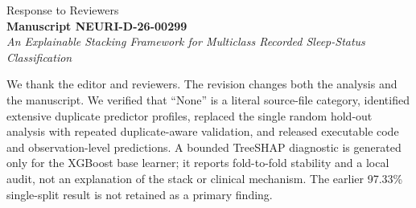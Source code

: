\documentclass[11pt]{article}
\begin{document}
\begin{center}
{\Large Response to Reviewers}\\[0.5em]
\textbf{Manuscript NEURI-D-26-00299}\\
\emph{An Explainable Stacking Framework for Multiclass Recorded Sleep-Status Classification}
\end{center}

We thank the editor and reviewers. The revision changes both the analysis and the manuscript. We verified that ``None'' is a literal source-file category, identified extensive duplicate predictor profiles, replaced the single random hold-out analysis with repeated duplicate-aware validation, and released executable code and observation-level predictions. A bounded TreeSHAP diagnostic is generated only for the XGBoost base learner; it reports fold-to-fold stability and a local audit, not an explanation of the stack or clinical mechanism. The earlier 97.33\% single-split result is not retained as a primary finding.
\end{document}
